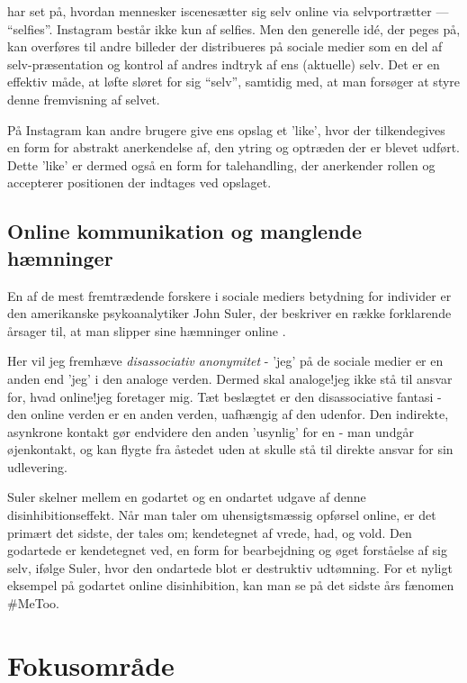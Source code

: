 \citeauthor{sulerSelfPortraitsSelfies2015} har set på, hvordan 
mennesker iscenesætter sig selv online via selvportrætter — 
“selfies”. Instagram består ikke kun af selfies. Men den 
generelle idé, der peges på, kan overføres til andre billeder der 
distribueres på sociale medier som en del af selv-præsentation og
kontrol af andres indtryk af ens (aktuelle) selv. Det er en
effektiv måde, at løfte sløret for sig “selv”, samtidig med, at
man forsøger at styre denne fremvisning af selvet.

På Instagram kan andre brugere give ens opslag et 'like', hvor der 
tilkendegives en form for abstrakt anerkendelse af, den ytring og 
optræden der er blevet udført. Dette 'like' er dermed også en form 
for talehandling, der anerkender rollen og accepterer positionen 
der indtages ved opslaget.

\subsection{Online kommunikation og manglende hæmninger}

En af de mest fremtrædende forskere i sociale mediers betydning
for individer er den amerikanske psykoanalytiker John Suler, der
beskriver en række forklarende årsager til, at man slipper sine
hæmninger online \autocite{sulerOnlineDisinhibitionEffect2004}.

Her vil jeg fremhæve \emph{disassociativ anonymitet} - 'jeg' på de 
sociale medier er en anden end 'jeg' i den analoge verden. Dermed
skal analoge!jeg ikke stå til ansvar for, hvad online!jeg 
foretager mig. Tæt beslægtet er den disassociative fantasi - den
online verden er en anden verden, uafhængig af den udenfor. Den
indirekte, asynkrone kontakt gør endvidere den anden 'usynlig' for
en - man undgår øjenkontakt, og kan flygte fra åstedet uden at
skulle stå til direkte ansvar for sin udlevering.

Suler skelner mellem en godartet og en ondartet udgave af denne
disinhibitionseffekt. Når man taler om uhensigtsmæssig opførsel
online, er det primært det sidste, der tales om; kendetegnet af
vrede, had, og vold. Den godartede er kendetegnet ved, en form for
bearbejdning og øget forståelse af sig selv, ifølge Suler, hvor
den ondartede blot er destruktiv udtømning. For et nyligt eksempel
på godartet online disinhibition, kan man se på det sidste års
fænomen \#MeToo.

\section{Fokusområde}

